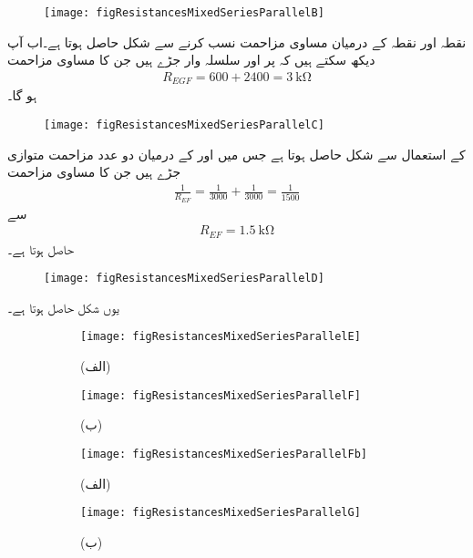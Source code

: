 \begin{figure}
\centering
\texttt{[image: figResistancesMixedSeriesParallelB]}
\caption{}
\label{مشق_مزاحمتی_سلسلہ_وار_متوازی_مزاحمت_الف}
\end{figure}

نقطہ  اور نقطہ  کے درمیان مساوی مزاحمت نسب کرنے سے شکل  حاصل ہوتا ہے۔اب آپ دیکھ سکتے ہیں کہ  پر  اور  سلسلہ وار جڑے ہیں جن کا مساوی مزاحمت
\begin{align*}
R_{EGF}=600+2400=\SI{3}{\kilo\ohm}
\end{align*}
ہو گا۔
\begin{figure}
\centering
\texttt{[image: figResistancesMixedSeriesParallelC]}
\caption{}
\label{مشق_مزاحمتی_سلسلہ_وار_متوازی_مزاحمت_ب}
\end{figure}

 کے استعمال سے شکل   حاصل ہوتا ہے جس میں  اور  کے درمیان دو عدد  مزاحمت متوازی جڑے ہیں جن کا مساوی مزاحمت
\begin{align*}
\frac{1}{R_{EF}}=\frac{1}{3000}+\frac{1}{3000}=\frac{1}{1500}
\end{align*}
سے
\begin{align*}
R_{EF}=\SI{1.5}{\kilo\ohm}
\end{align*}
حاصل ہوتا ہے۔
\begin{figure}
\centering
\texttt{[image: figResistancesMixedSeriesParallelD]}
\caption{}
\label{مشق_مزاحمتی_سلسلہ_وار_متوازی_مزاحمت_پ}
\end{figure}
یوں شکل  حاصل ہوتا ہے۔
\begin{figure}
\centering
\begin{subfigure}{0.5\textwidth}
\centering
\texttt{[image: figResistancesMixedSeriesParallelE]}
\caption*{(الف)}
\end{subfigure}%
\begin{subfigure}{0.5\textwidth}
\centering
\texttt{[image: figResistancesMixedSeriesParallelF]}
\caption*{(ب)}
\end{subfigure}%
\caption{}
\label{مشق_مزاحمتی_سلسلہ_وار_متوازی_مزاحمت_ت}
\end{figure}
\begin{figure}
\centering
\begin{subfigure}{0.5\textwidth}
\centering
\texttt{[image: figResistancesMixedSeriesParallelFb]}
\caption*{(الف)}
\end{subfigure}%
\begin{subfigure}{0.5\textwidth}
\centering
\texttt{[image: figResistancesMixedSeriesParallelG]}
\caption*{(ب)}
\end{subfigure}%
\caption{}
\label{مشق_مزاحمتی_سلسلہ_وار_متوازی_مزاحمت_ٹ}
\end{figure}

